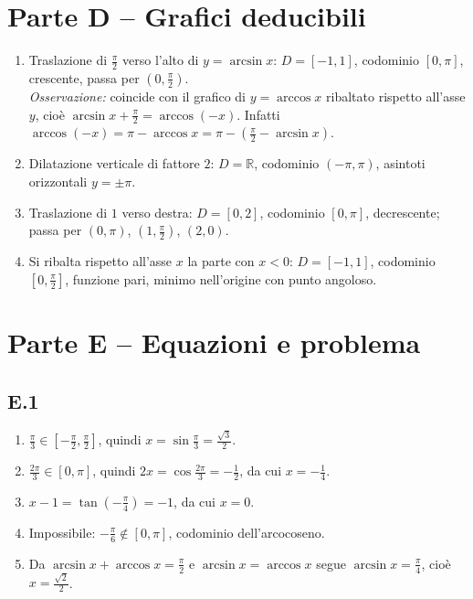 \documentclass[11pt,a4paper]{article}
\begin{document}
\section*{Parte D -- Grafici deducibili}
\begin{enumerate}
\item Traslazione di $\frac{\pi}{2}$ verso l'alto di $y=\arcsin x$: $D=[-1,1]$, codominio $[0,\pi]$, crescente, passa per $\left(0,\frac{\pi}{2}\right)$.\\
\emph{Osservazione:} coincide con il grafico di $y=\arccos x$ ribaltato rispetto all'asse $y$, cio\`e $\arcsin x+\frac{\pi}{2}=\arccos(-x)$. Infatti $\arccos(-x)=\pi-\arccos x=\pi-\left(\frac{\pi}{2}-\arcsin x\right)$.
\item Dilatazione verticale di fattore $2$: $D=\mathbb{R}$, codominio $(-\pi,\pi)$, asintoti orizzontali $y=\pm\pi$.
\item Traslazione di $1$ verso destra: $D=[0,2]$, codominio $[0,\pi]$, decrescente; passa per $(0,\pi)$, $\left(1,\frac{\pi}{2}\right)$, $(2,0)$.
\item Si ribalta rispetto all'asse $x$ la parte con $x<0$: $D=[-1,1]$, codominio $\left[0,\frac{\pi}{2}\right]$, funzione pari, minimo nell'origine con punto angoloso.
\end{enumerate}

\section*{Parte E -- Equazioni e problema}
\subsection*{E.1}
\begin{enumerate}
\item $\frac{\pi}{3}\in\left[-\frac{\pi}{2},\frac{\pi}{2}\right]$, quindi $x=\sin\frac{\pi}{3}=\frac{\sqrt3}{2}$.
\item $\frac{2\pi}{3}\in[0,\pi]$, quindi $2x=\cos\frac{2\pi}{3}=-\frac12$, da cui $x=-\frac14$.
\item $x-1=\tan\left(-\frac{\pi}{4}\right)=-1$, da cui $x=0$.
\item Impossibile: $-\frac{\pi}{6}\notin[0,\pi]$, codominio dell'arcocoseno.
\item Da $\arcsin x+\arccos x=\frac{\pi}{2}$ e $\arcsin x=\arccos x$ segue $\arcsin x=\frac{\pi}{4}$, cio\`e $x=\frac{\sqrt2}{2}$.
\end{enumerate}
\end{document}
